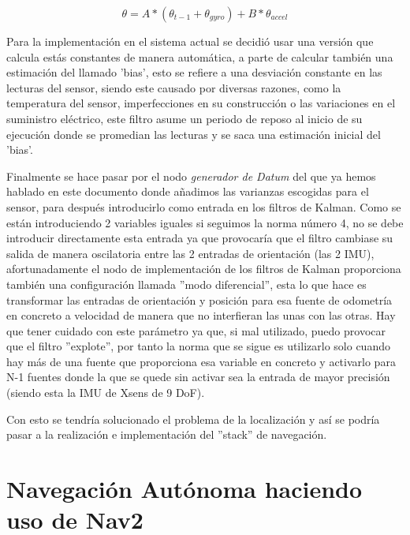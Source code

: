 \begin{equation}\label{filtro_complementario}
  \theta = A * (\theta_{t - 1} + \theta_{gyro} ) + B * \theta_{accel}
\end{equation}

Para la implementación en el sistema actual se decidió usar una versión que calcula estás constantes de manera automática, a parte de calcular 
también una estimación del llamado 'bias', esto se refiere a una desviación constante en las lecturas del sensor, siendo este causado por diversas razones, como la
temperatura del sensor, imperfecciones en su construcción o las variaciones en el suministro eléctrico, este filtro asume un periodo de reposo al inicio de su ejecución donde se promedian las lecturas 
y se saca una estimación inicial del 'bias'.

Finalmente se hace pasar por el nodo \textit{generador de Datum} del que ya hemos hablado en este documento donde añadimos las varianzas 
escogidas para el sensor, para después introducirlo como entrada en los filtros de Kalman. Como se están introduciendo 2 variables iguales si seguimos 
la norma número 4, no se debe introducir directamente esta entrada ya que provocaría que el filtro cambiase su salida de manera oscilatoria 
entre las 2 entradas de orientación (las 2 IMU), afortunadamente el nodo de implementación de los filtros de Kalman proporciona también una 
configuración llamada ''modo diferencial'', esta lo que hace es transformar las entradas de orientación y posición para esa fuente de odometría en 
concreto a velocidad de manera que no interfieran las unas con las otras. Hay que tener cuidado con este parámetro ya que, si mal utilizado, puedo provocar que el filtro 
''explote'', por tanto la norma que se sigue es utilizarlo solo cuando hay más de una fuente que proporciona esa variable en concreto y activarlo para N-1 fuentes 
donde la que se quede sin activar sea la entrada de mayor precisión (siendo esta la IMU de Xsens de 9 DoF).


Con esto se tendría solucionado el problema de la localización y así se podría pasar a la realización e implementación del ''stack'' 
de navegación.

\section{Navegación Autónoma haciendo uso de Nav2}

